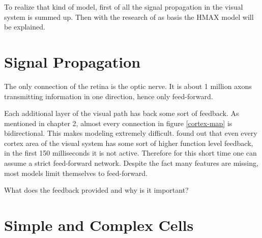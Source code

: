 	To realize that kind of model, first of all the signal propagation in the visual system is summed up. Then with the research of \citep{hubel1962receptive} as basis the HMAX model will be explained.

%		
%		
%		
%		
%		
%
%			
%			
	
		
	\section{Signal Propagation}
		
		The only connection of the retina is the optic nerve. It is about 1 million axons transmitting information in one direction, hence only feed-forward.
		
		Each additional layer of the visual path has back some sort of feedback. As mentioned in chapter 2, almost every connection in figure \ref{cortex-map} is bidirectional. This makes modeling extremely difficult. \citeauthor{thorpe1996speed} found out that even every cortex area of the visual system has some sort of higher function level feedback, in the first 150 milliseconds it is not active. Therefore for this short time one can assume a strict feed-forward network. Despite the fact many features are missing, most models limit themselves to feed-forward.
		
		What does the feedback provided and why is it important?
		
	\section{Simple and Complex Cells}
		
